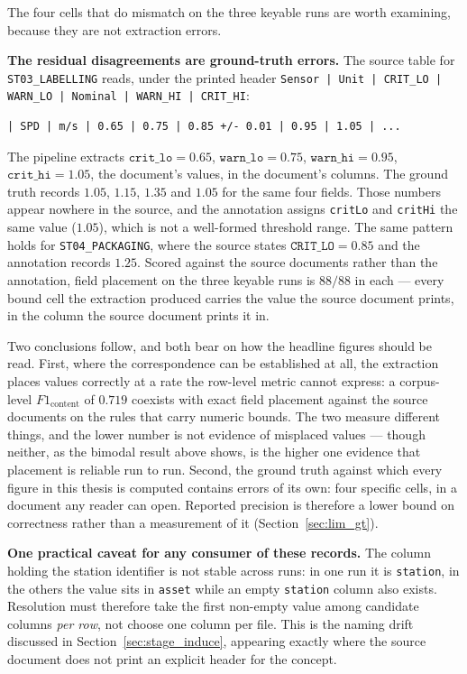 \documentclass[11pt]{article}
\begin{document}
The four cells that do mismatch on the three keyable runs are worth examining,
because they are not extraction errors.

\textbf{The residual disagreements are ground-truth errors.} The source table for
\texttt{ST03\_LABELLING} reads, under the printed header
\texttt{Sensor | Unit | CRIT\_LO | WARN\_LO | Nominal | WARN\_HI | CRIT\_HI}:

\begin{lstlisting}
| SPD | m/s | 0.65 | 0.75 | 0.85 +/- 0.01 | 0.95 | 1.05 | ...
\end{lstlisting}

The pipeline extracts $\texttt{crit\_lo}=0.65$, $\texttt{warn\_lo}=0.75$,
$\texttt{warn\_hi}=0.95$, $\texttt{crit\_hi}=1.05$, the document's values, in
the document's columns. The ground truth records $1.05$, $1.15$, $1.35$ and
$1.05$ for the same four fields. Those numbers appear nowhere in the source, and
the annotation assigns \texttt{critLo} and \texttt{critHi} the same value
($1.05$), which is not a well-formed threshold range. The same pattern holds for
\texttt{ST04\_PACKAGING}, where the source states $\texttt{CRIT\_LO}=0.85$ and the
annotation records $1.25$. Scored against the source documents rather than the
annotation, field placement on the three keyable runs is $88/88$ in each ---
every bound cell the extraction produced carries the value the source document
prints, in the column the source document prints it in.

Two conclusions follow, and both bear on how the headline figures should be read.
First, where the correspondence can be established at all, the extraction places
values correctly at a rate the row-level metric cannot express: a corpus-level
$F1_{\text{content}}$ of $0.719$ coexists with exact field placement against the
source documents on the rules that carry numeric bounds. The two measure
different things, and the lower number is not evidence of misplaced values ---
though neither, as the bimodal result above shows, is the higher one evidence
that placement is reliable run to run. Second, the ground truth against which every figure in this thesis is
computed contains errors of its own: four specific cells, in a document any
reader can open. Reported precision is therefore a lower bound on correctness
rather than a measurement of it (Section~\ref{sec:lim_gt}).

\textbf{One practical caveat for any consumer of these records.} The column
holding the station identifier is not stable across runs: in one run it is
\texttt{station}, in the others the value sits in \texttt{asset} while an empty
\texttt{station} column also exists. Resolution must therefore take the first
non-empty value among candidate columns \emph{per row}, not choose one column per
file. This is the naming drift discussed in Section~\ref{sec:stage_induce},
appearing exactly where the source document does not print an explicit header for
the concept.
\end{document}
